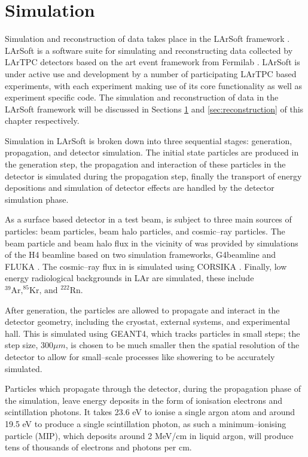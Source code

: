 \section{Simulation} \label{sec:simulation}

Simulation and reconstruction of \protodune{} data takes place in the LArSoft
framework \cite{Snider2017}. LArSoft is a software suite for simulating and
reconstructing data collected by LArTPC detectors based on the art event 
framework from Fermilab \cite{Green:2012gv}. LArSoft is under active use and
development by a number of participating LArTPC based experiments, with each
experiment making use of its core functionality as well as experiment specific
code. The simulation and reconstruction of \protodune{} data in the LArSoft
framework will be discussed in Sections \ref{sec:simulation} and
\ref{sec:reconstruction} of this chapter respectively.

Simulation in LArSoft is broken down into three sequential stages: generation,
propagation, and detector simulation. The initial state particles are produced
in the generation step, the propagation and interaction of these particles in
the detector is simulated during the propagation step, finally the transport of 
energy depositions and simulation of detector effects are handled by the
detector simulation phase.

As a surface based detector in a test beam, \protodune{} is subject to three
main sources of particles: beam particles, beam halo particles, and cosmic--ray
particles. The beam particle and beam halo flux in the vicinity of 
\protodune{} was provided by simulations of the H4 beamline 
\cite{Booth:2019brj} based on two simulation frameworks, G4beamline 
\cite{g4beamline} and FLUKA \cite{BOHLEN2014211}. The cosmic--ray flux in
\protodune{} is simulated using CORSIKA \cite{Heck:1998vt}. Finally, low energy 
radiological backgrounds in LAr are simulated, these include $^{39}\mbox{Ar,} ^
{85}\mbox{Kr, and } ^{222}\mbox{Rn}$.

After generation, the particles are allowed to propagate and interact in the 
detector geometry, including the cryostat, external systems, and experimental
hall. This is simulated using GEANT4\cite{Agostinelli:2002hh}, which tracks 
particles in small steps; the step size, $300 \mu m$, is chosen to be much 
smaller then the spatial resolution of the detector to allow for small--scale 
processes like showering to be accurately simulated. 

Particles which propagate through the detector, during the propagation phase of
the simulation, leave energy deposits in the form of ionisation electrons and
scintillation photons. It takes 23.6 eV to ionise a single argon atom and 
around 19.5 eV to produce a single scintillation photon, as such a 
minimum--ionising particle (MIP), which deposits around 2 MeV/cm
in liquid argon, will produce tens of thousands of electrons and photons per cm.

